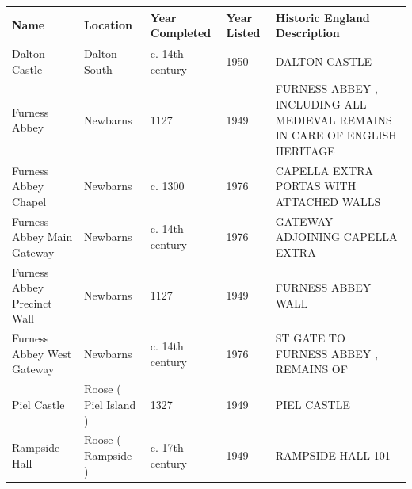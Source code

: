 \documentclass{article}
\begin{document}
\begin{tabular}{lllll}
\toprule
Name & Location & Year Completed & Year Listed & Historic England Description \\
\midrule
Dalton Castle & Dalton South & c. 14th century & 1950 & DALTON CASTLE \\
Furness Abbey & Newbarns & 1127 & 1949 & FURNESS ABBEY , INCLUDING ALL MEDIEVAL REMAINS IN CARE OF ENGLISH HERITAGE \\
Furness Abbey Chapel & Newbarns & c. 1300 & 1976 & CAPELLA EXTRA PORTAS WITH ATTACHED WALLS \\
Furness Abbey Main Gateway & Newbarns & c. 14th century & 1976 & GATEWAY ADJOINING CAPELLA EXTRA \\
Furness Abbey Precinct Wall & Newbarns & 1127 & 1949 & FURNESS ABBEY WALL \\
Furness Abbey West Gateway & Newbarns & c. 14th century & 1976 & ST GATE TO FURNESS ABBEY , REMAINS OF \\
Piel Castle & Roose ( Piel Island ) & 1327 & 1949 & PIEL CASTLE \\
Rampside Hall & Roose ( Rampside ) & c. 17th century & 1949 & RAMPSIDE HALL 101 \\
\bottomrule
\end{tabular}
\end{document}
